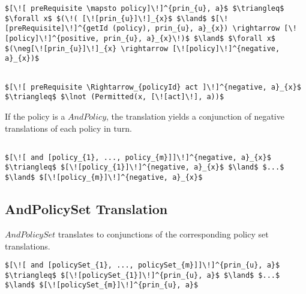 \lstset{mathescape, language=AST}  
\begin{lstlisting}[frame=single, caption={Policy Set Translation {$\colon$} PrimitiveExclusivePolicySet},label={lst:transpolicyformulaPrimitiveExclusivePolicySet}]
$[\![ preRequisite \mapsto policy]\!]^{prin_{u}, a}$ $\triangleq$ $\forall x$ $(\!( [\![prin_{u}]\!]_{x}$ $\land$ $[\![preRequisite]\!]^{getId (policy), prin_{u}, a}_{x}) \rightarrow [\![policy]\!]^{positive, prin_{u}, a}_{x}\!)$ $\land$ $\forall x$ $(\neg[\![prin_{u}]\!]_{x} \rightarrow [\![policy]\!]^{negative, a}_{x})$
\end{lstlisting}


\lstset{mathescape, language=AST}  
\begin{lstlisting}[frame=single, caption={Negative Policy Translation {$\colon$} Single policy},label={lst:transpolicynegativeSingle}]

$[\![ preRequisite \Rightarrow_{policyId} act ]\!]^{negative, a}_{x}$ $\triangleq$ $\lnot (Permitted(x, [\![act]\!], a))$
\end{lstlisting}

If the policy is a $AndPolicy$, the translation yields a conjunction of negative translations of each policy in turn.

\lstset{mathescape, language=AST}  
\begin{lstlisting}[frame=single, caption={Negative Policy Translation {$\colon$} List of policies},label={lst:transpolicynegativeListOfPolicies}]

$[\![ and [policy_{1}, ..., policy_{m}]]\!]^{negative, a}_{x}$ $\triangleq$ $[\![policy_{1}]\!]^{negative, a}_{x}$ $\land$ $...$ $\land$ $[\![policy_{m}]\!]^{negative, a}_{x}$

\end{lstlisting}

\subsection{AndPolicySet Translation}
$AndPolicySet$ translates to conjunctions of the corresponding policy set translations. 

\lstset{mathescape, language=AST}  
\begin{lstlisting}[frame=single, caption={Policy Set Translation {$\colon$} AndPolicySet},label={lst:transpolicyformulaAndPolicySet}]
$[\![ and [policySet_{1}, ..., policySet_{m}]]\!]^{prin_{u}, a}$ $\triangleq$ $[\![policySet_{1}]\!]^{prin_{u}, a}$ $\land$ $...$ $\land$ $[\![policySet_{m}]\!]^{prin_{u}, a}$

\end{lstlisting}

